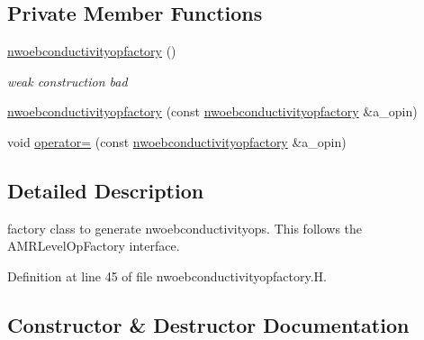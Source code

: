 \subsection*{Private Member Functions}
\begin{DoxyCompactItemize}
\item 
\hyperlink{classnwoebconductivityopfactory_a9312c02f6ac0e3bbcdde08aa3bddf540}{nwoebconductivityopfactory} ()
\begin{DoxyCompactList}\small\item\em weak construction bad \end{DoxyCompactList}\item 
\hyperlink{classnwoebconductivityopfactory_a19130228cba6bc8699504855c0e8f8eb}{nwoebconductivityopfactory} (const \hyperlink{classnwoebconductivityopfactory}{nwoebconductivityopfactory} \&a\+\_\+opin)
\item 
void \hyperlink{classnwoebconductivityopfactory_a60fcb648d6f49ba79c6483d109ec3b07}{operator=} (const \hyperlink{classnwoebconductivityopfactory}{nwoebconductivityopfactory} \&a\+\_\+opin)
\end{DoxyCompactItemize}


\subsection{Detailed Description}
factory class to generate nwoebconductivityops. This follows the A\+M\+R\+Level\+Op\+Factory interface. 

Definition at line 45 of file nwoebconductivityopfactory.\+H.



\subsection{Constructor \& Destructor Documentation}
